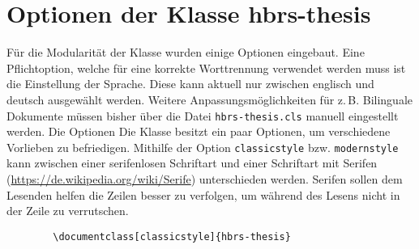 \chapter{Optionen der Klasse hbrs-thesis}
\label{chap:klassenoptionen}
Für die Modularität der Klasse wurden einige Optionen eingebaut. Eine Pflichtoption, welche für eine korrekte Worttrennung verwendet werden muss ist die Einstellung der Sprache. Diese kann aktuell nur zwischen englisch und deutsch ausgewählt werden. Weitere Anpassungsmöglichkeiten für z.\,B. Bilinguale Dokumente müssen bisher über die Datei \texttt{hbrs-thesis.cls} manuell eingestellt werden. Die Optionen 
Die Klasse besitzt ein paar Optionen, um verschiedene Vorlieben zu befriedigen. Mithilfe der Option \texttt{classicstyle} bzw. \texttt{modernstyle} kann zwischen einer serifenlosen Schriftart und einer Schriftart mit Serifen (\url{https://de.wikipedia.org/wiki/Serife}) unterschieden werden. Serifen sollen dem Lesenden helfen die Zeilen besser zu verfolgen, um während des Lesens nicht in der Zeile zu verrutschen.

\begin{cde}
    \begin{verbatim}
        \documentclass[classicstyle]{hbrs-thesis}
    \end{verbatim}
\end{cde}